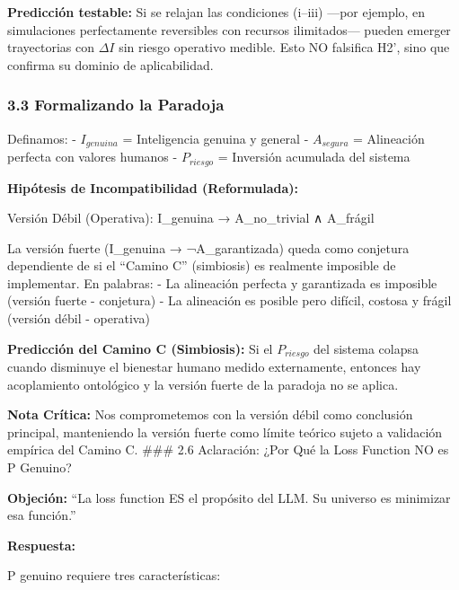 \textbf{Predicción testable:} Si se relajan las condiciones (i--iii)
---por ejemplo, en simulaciones perfectamente reversibles con recursos
ilimitados--- pueden emerger trayectorias con \(\Delta I\) sin riesgo
operativo medible. Esto NO falsifica H2', sino que confirma su dominio
de aplicabilidad.

\subsubsection{3.3 Formalizando la
Paradoja}\label{formalizando-la-paradoja}

Definamos: - \(I_{genuina}\) = Inteligencia genuina y general -
\(A_{segura}\) = Alineación perfecta con valores humanos -
\(P_{riesgo}\) = Inversión acumulada del sistema

\textbf{Hipótesis de Incompatibilidad (Reformulada):}

Versión Débil (Operativa): I\_genuina → A\_no\_trivial ∧ A\_frágil

La versión fuerte (I\_genuina → ¬A\_garantizada) queda como conjetura
dependiente de si el ``Camino C'' (simbiosis) es realmente imposible de
implementar. En palabras: - La alineación perfecta y garantizada es
imposible (versión fuerte - conjetura) - La alineación es posible pero
difícil, costosa y frágil (versión débil - operativa)

\textbf{Predicción del Camino C (Simbiosis):} Si el \(P_{riesgo}\) del
sistema colapsa cuando disminuye el bienestar humano medido
externamente, entonces hay acoplamiento ontológico y la versión fuerte
de la paradoja no se aplica.

\textbf{Nota Crítica:} Nos comprometemos con la versión débil como
conclusión principal, manteniendo la versión fuerte como límite teórico
sujeto a validación empírica del Camino C. \#\#\# 2.6 Aclaración: ¿Por
Qué la Loss Function NO es P Genuino?

\textbf{Objeción:} ``La loss function ES el propósito del LLM. Su
universo es minimizar esa función.''

\textbf{Respuesta:}

P genuino requiere tres características:

